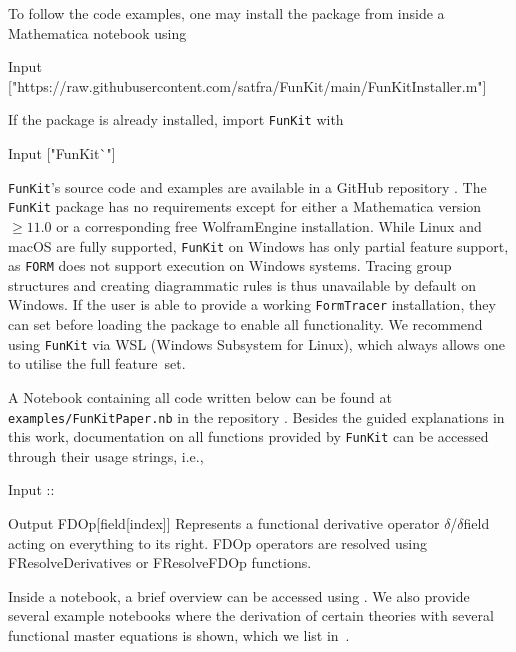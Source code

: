 \documentclass[preprint,10pt,sort&compress]{elsarticle}
\newcommand{\mathem}{\mmaInlineCell{Code}}
\newcommand{\FunKit}{\texttt{FunKit}\xspace}
\newcommand{\FormTracer}{\texttt{FormTracer}\xspace}
\newcommand{\FORM}{\texttt{FORM}\xspace}
\begin{document}
To follow the code examples, one may install the package from inside a Mathematica notebook using
%
\begin{mmaCell}{Input}
["https://raw.githubusercontent.com/satfra/FunKit/main/FunKitInstaller.m"]
\end{mmaCell}
%
If the package is already installed, import \FunKit with
%
\begin{mmaCell}{Input}
["FunKit\`{}"]
\end{mmaCell}
%
\FunKit's source code and examples are available in a GitHub repository \cite{FunKitRepo}.
The \FunKit package has no requirements except for either a Mathematica version $\geq 11.0$ or a corresponding free WolframEngine installation.
While Linux and macOS are fully supported, \FunKit on Windows has only partial feature support, as \FORM does not support execution on Windows systems. Tracing group structures and creating diagrammatic rules is thus unavailable by default on Windows. If the user is able to provide a working \FormTracer installation, they can set \mathem{\mmaDef{$UseFORMOnWindows}=True} before loading the package to enable all functionality.
We recommend using \FunKit via WSL (Windows Subsystem for Linux), which always allows one to utilise the full feature~set.

A Notebook containing all code written below can be found at \texttt{examples/FunKitPaper.nb} in the repository \cite{FunKitRepo}.
Besides the guided explanations in this work, documentation on all functions provided by \FunKit can be accessed through their usage strings, i.e.,
%
\begin{mmaCell}{Input}
::
\end{mmaCell}
\begin{mmaCell}{Output}
FDOp[field[index]]
Represents a functional derivative operator \({\delta}\)/\({\delta}\)field acting on everything to its right. 
FDOp operators are resolved using FResolveDerivatives or FResolveFDOp functions.
\end{mmaCell}
%
Inside a notebook, a brief overview can be accessed using \mathem{\mmaDef{FInfo[]}}.
We also provide several example notebooks where the derivation of certain theories with several functional master equations is shown, which we list in~.
\end{document}
